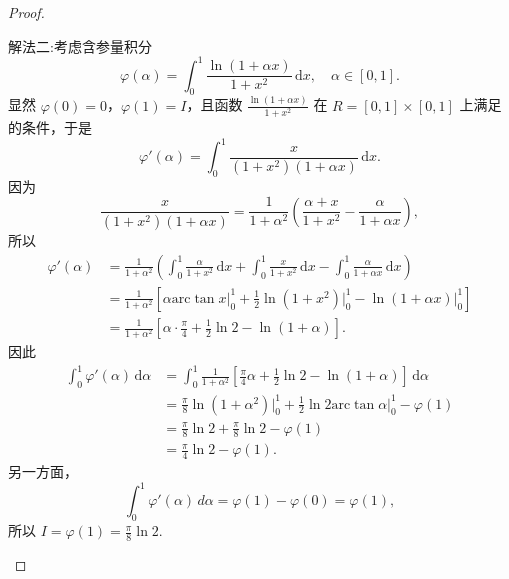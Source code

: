 \documentclass[../../main.tex]{subfiles}
\begin{document}
\begin{proof}
\begin{enumerate}
{\color{blue}解法二:}考虑含参量积分
\[
\varphi(\alpha) = \int_{0}^{1} \frac{\ln(1 + \alpha x)}{1 + x^2} \, \mathrm{d}x, \quad \alpha \in [0,1].
\]
显然 \( \varphi(0) = 0 \)，\( \varphi(1) = I \)，且函数 \( \frac{\ln(1 + \alpha x)}{1 + x^2} \) 在 \( R = [0,1] \times [0,1] \) 上满足 的条件，于是
\[
\varphi'(\alpha) = \int_{0}^{1} \frac{x}{(1 + x^2)(1 + \alpha x)} \, \mathrm{d}x.
\]
因为
\[
\frac{x}{(1 + x^2)(1 + \alpha x)} = \frac{1}{1 + \alpha^2} \left( \frac{\alpha + x}{1 + x^2} - \frac{\alpha}{1 + \alpha x} \right),
\]
所以
\begin{align*}
\varphi' \left( \alpha \right) &=\frac{1}{1+\alpha ^2}\left( \int_0^1{\frac{\alpha}{1+x^2}\,\mathrm{d}x}+\int_0^1{\frac{x}{1+x^2}\,\mathrm{d}x}-\int_0^1{\frac{\alpha}{1+\alpha x}\,\mathrm{d}x} \right) 
\\
&=\frac{1}{1+\alpha ^2}\left[ \alpha \mathrm{arc}\tan x\Big|_{0}^{1}+\frac{1}{2}\ln \left( 1+x^2 \right) \Big|_{0}^{1}-\ln \left( 1+\alpha x \right) \Big|_{0}^{1} \right] 
\\
&=\frac{1}{1+\alpha ^2}\left[ \alpha \cdot \frac{\pi}{4}+\frac{1}{2}\ln 2-\ln \left( 1+\alpha \right) \right] .
\end{align*}
因此
\begin{align*}
\int_0^1{\varphi' \left( \alpha \right) \,\mathrm{d}\alpha}&=\int_0^1{\frac{1}{1+\alpha ^2}\left[ \frac{\pi}{4}\alpha +\frac{1}{2}\ln 2-\ln \left( 1+\alpha \right) \right] \,\mathrm{d}\alpha}
\\
&=\frac{\pi}{8}\ln \left( 1+\alpha ^2 \right) \Big|_{0}^{1}+\frac{1}{2}\ln 2\mathrm{arc}\tan \alpha \Big|_{0}^{1}-\varphi \left( 1 \right) 
\\
&=\frac{\pi}{8}\ln 2+\frac{\pi}{8}\ln 2-\varphi \left( 1 \right) 
\\
&=\frac{\pi}{4}\ln 2-\varphi \left( 1 \right) .
\end{align*}
另一方面，
\[
\int_{0}^{1} \varphi'(\alpha) \, d\alpha = \varphi(1) - \varphi(0) = \varphi(1),
\]
所以 \( I = \varphi(1) = \frac{\pi}{8} \ln 2 \).
\end{enumerate}
\end{proof}
\end{document}
